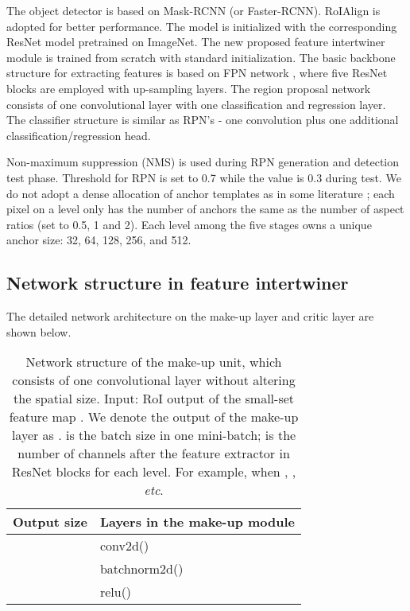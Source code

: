 \documentclass{article} \usepackage{iclr2019_conference,times}
\begin{document}
{
The object detector is based on Mask-RCNN (or Faster-RCNN).
RoIAlign is adopted for better performance. The model is initialized with the corresponding ResNet model pretrained on ImageNet. The new proposed feature intertwiner module is trained from scratch with standard initialization. The basic backbone structure for extracting features is based on FPN network \citep{lin2017_FPN}, where five ResNet blocks are employed with up-sampling layers. The region proposal network consists of one convolutional layer with one classification and regression layer.
The classifier structure is similar as RPN's - one convolution plus one additional classification/regression head.}

Non-maximum suppression (NMS) is used during RPN generation and detection test phase. Threshold for RPN is set to 0.7 while the value is 0.3 during test.
We do not adopt a dense allocation of anchor templates as in some literature \citep{liu2015_ssd,redmon2017_yolo_v1}; each pixel on a level only has the number of anchors the same as the number of aspect ratios (set to 0.5, 1 and 2). Each level  among the five stages owns a unique anchor size: 32, 64, 128, 256, and 512.  
{
\subsection{Network structure in feature intertwiner}\label{sec:network_feat_inter}}

{	
The detailed network architecture on the make-up layer and critic layer are shown below.
}

\begin{table*}[h]
	\centering
	\begin{tabular}{   l |  l}
		Output size & Layers in the make-up module \\ \toprule
		 & conv2d() \\
		 & batchnorm2d() \\
		 & relu() \\
	\end{tabular}
	\vspace{-.2cm}
	\caption{
{
		Network structure of the make-up unit, which consists of one convolutional
layer without altering the spatial size. Input: RoI output of the small-set feature map . We denote the output of the make-up layer as .
		 is the batch size in one mini-batch;  is the number of channels after the feature extractor in ResNet blocks for each level. For example, when , , \textit{etc}.}
	}\label{tab:make_up_layer}
\end{table*}
\end{document}
